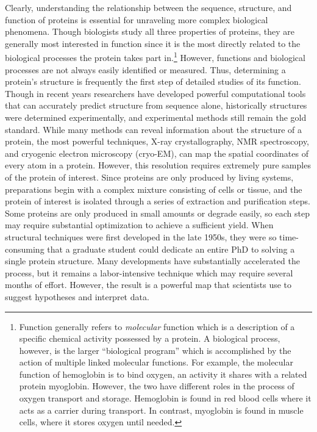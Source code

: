 Clearly, understanding the relationship between the sequence, structure, and function of proteins is essential for unraveling more complex biological phenomena. Though biologists study all three properties of proteins, they are generally most interested in function since it is the most directly related to the biological processes the protein takes part in.\footnote{Function generally refers to \textit{molecular} function which is a description of a specific chemical activity possessed by a protein. A biological process, however, is the larger ``biological program'' which is accomplished by the action of multiple linked molecular functions. For example, the molecular function of hemoglobin is to bind oxygen, an activity it shares with a related protein myoglobin. However, the two have different roles in the process of oxygen transport and storage. Hemoglobin is found in red blood cells where it acts as a carrier during transport. In contrast, myoglobin is found in muscle cells, where it stores oxygen until needed.} However, functions and biological processes are not always easily identified or measured. Thus, determining a protein's structure is frequently the first step of detailed studies of its function. Though in recent years researchers have developed powerful computational tools that can accurately predict structure from sequence alone, historically structures were determined experimentally, and experimental methods still remain the gold standard. While many methods can reveal information about the structure of a protein, the most powerful techniques, X-ray crystallography, NMR spectroscopy, and cryogenic electron microscopy (cryo-EM), can map the spatial coordinates of every atom in a protein. However, this resolution requires extremely pure samples of the protein of interest. Since proteins are only produced by living systems, preparations begin with a complex mixture consisting of cells or tissue, and the protein of interest is isolated through a series of extraction and purification steps. Some proteins are only produced in small amounts or degrade easily, so each step may require substantial optimization to achieve a sufficient yield. When structural techniques were first developed in the late 1950s, they were so time-consuming that a graduate student could dedicate an entire PhD to solving a single protein structure. Many developments have substantially accelerated the process, but it remains a labor-intensive technique which may require several months of effort. However, the result is a powerful map that scientists use to suggest hypotheses and interpret data.

